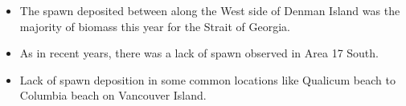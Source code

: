 \begin{itemize}
\item The spawn deposited between along the West side of Denman Island was the majority of biomass this year for the Strait of Georgia.
\item As in recent years, there was a lack of spawn observed in Area 17 South.
\item Lack of spawn deposition in some common locations like Qualicum beach to Columbia beach on Vancouver Island.
\end{itemize}